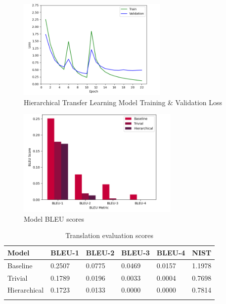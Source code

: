 \begin{figure}[ht!]
\centering
\includegraphics[width=0.65\textwidth]{media/experiments/loss/5k/loss_hierarchical.png}
\captionsetup{justification=centering}
\caption[Baseline Model Training \& Validation Loss]{Hierarchical Transfer Learning Model Training \& Validation Loss}
\label{fig:loss_hierarchical}
\end{figure}



\begin{figure}[!ht]
\centering
\includegraphics[width=0.70\textwidth]{media/experiments/bleu/5k_bleu.png}
\captionsetup{justification=centering}
\caption[Model BLEU scores]{Model BLEU scores}
\label{fig:bleu_results}
\end{figure}

\begin{table}[!ht]
\centering
\setlength\doublerulesep{2pt}
\renewcommand{\arraystretch}{1.1}
\begin{longtable}{|l|l|l|l|l|l|}
\hline
\textbf{Model} & \textbf{BLEU-1} & \textbf{BLEU-2} & \textbf{BLEU-3} & \textbf{BLEU-4} & \textbf{NIST}\\ \hline
\endhead
%
\hline
\endfoot
%
\endlastfoot
%
Baseline       & 0.2507 & 0.0775 & 0.0469 & 0.0157 & 1.1978 \\
Trivial        & 0.1789 & 0.0196 & 0.0033 & 0.0004 & 0.7698 \\
Hierarchical   & 0.1723 & 0.0133 & 0.0000 & 0.0000 & 0.7814 \\ \hline
\captionsetup{justification=centering}
\caption{Translation evaluation scores}
\label{tab:bleu_table}\\
\end{longtable}
\end{table}



